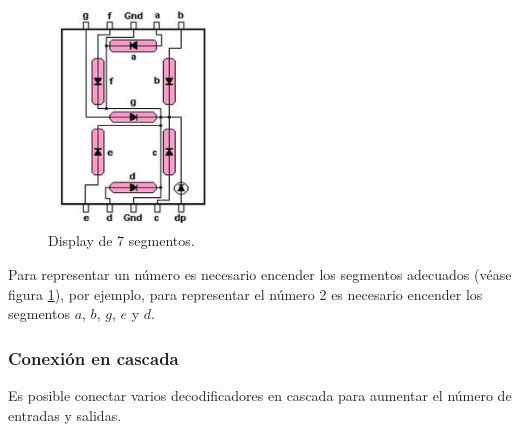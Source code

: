 \documentclass[a4paper, 11pt, titlepage]{article}
\begin{document}
			\begin{figure}[htp]
				\centering
				\includegraphics[width=0.4\textwidth]{resources/7segmentos.jpg}
				\caption{Display de 7 segmentos.}
				\label{7segmentos}
			\end{figure}

			Para representar un número es necesario encender los segmentos adecuados (véase figura 
			\ref{7segmentos}), por ejemplo, para representar el número 2 es necesario encender los 
			segmentos $a$, $b$, $g$, $e$ y $d$.

		\subsubsection{Conexión en cascada}

			Es posible conectar varios decodificadores en cascada para aumentar el número de entradas y 
			salidas.
	
\end{document}
